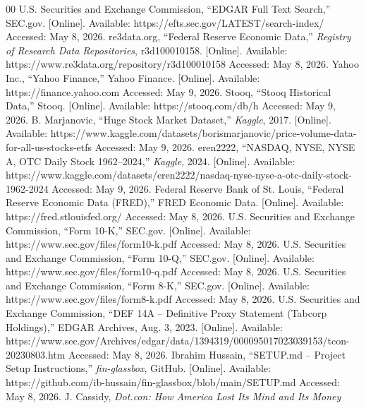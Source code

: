 \documentclass[conference]{IEEEtran}
\begin{document}
\begin{thebibliography}{00}
    U.S. Securities and Exchange Commission, ``EDGAR Full Text Search,''
    SEC.gov. [Online]. Available: https://efts.sec.gov/LATEST/search-index/
    Accessed: May 8, 2026.
    re3data.org, ``Federal Reserve Economic Data,''
    \textit{Registry of Research Data Repositories}, r3d100010158.
    [Online]. Available: https://www.re3data.org/repository/r3d100010158
    Accessed: May 8, 2026.
    Yahoo Inc., ``Yahoo Finance,'' Yahoo Finance. [Online].
    Available: https://finance.yahoo.com
    Accessed: May 9, 2026.
    Stooq, ``Stooq Historical Data,'' Stooq. [Online].
    Available: https://stooq.com/db/h
    Accessed: May 9, 2026.
    B. Marjanovic, ``Huge Stock Market Dataset,'' \textit{Kaggle},
    2017. [Online]. Available:
    https://www.kaggle.com/datasets/borismarjanovic/price-volume-data-for-all-us-stocks-etfs
    Accessed: May 9, 2026.
    eren2222, ``NASDAQ, NYSE, NYSE A, OTC Daily Stock 1962--2024,''
    \textit{Kaggle}, 2024. [Online]. Available:
    https://www.kaggle.com/datasets/eren2222/nasdaq-nyse-nyse-a-otc-daily-stock-1962-2024
    Accessed: May 9, 2026.
    Federal Reserve Bank of St. Louis, ``Federal Reserve Economic Data (FRED),''
    FRED Economic Data. [Online]. Available: https://fred.stlouisfed.org/
    Accessed: May 8, 2026.
    U.S. Securities and Exchange Commission, ``Form 10-K,''
    SEC.gov. [Online]. Available: https://www.sec.gov/files/form10-k.pdf
    Accessed: May 8, 2026.
    U.S. Securities and Exchange Commission, ``Form 10-Q,''
    SEC.gov. [Online]. Available: https://www.sec.gov/files/form10-q.pdf
    Accessed: May 8, 2026.
    U.S. Securities and Exchange Commission, ``Form 8-K,''
    SEC.gov. [Online]. Available: https://www.sec.gov/files/form8-k.pdf
    Accessed: May 8, 2026.
    U.S. Securities and Exchange Commission, ``DEF 14A -- Definitive Proxy
    Statement (Tabcorp Holdings),'' EDGAR Archives, Aug. 3, 2023. [Online].
    Available: https://www.sec.gov/Archives/edgar/data/1394319/000095017023039153/tcon-20230803.htm
    Accessed: May 8, 2026.
    Ibrahim Hussain, ``SETUP.md -- Project Setup Instructions,''
    \textit{fin-glassbox}, GitHub. [Online].
    Available: https://github.com/ib-hussain/fin-glassbox/blob/main/SETUP.md
    Accessed: May 8, 2026.
    J. Cassidy, \textit{Dot.con: How America Lost Its Mind and Its Money
}
\end{thebibliography}
\end{document}
